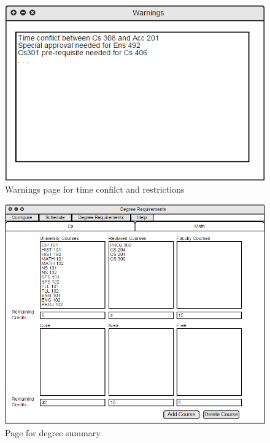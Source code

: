 \documentclass[twoside,letterpaper]{article}
\begin{document}
\begin{figure}[h!]
\centering
\includegraphics[keepaspectratio, scale=0.45]{Mockups/warning.png}
\caption{Warnings page for time confilct and restrictions}
\label{fig:mockupWarning}
\end{figure}

\begin{figure}[h!]
\centering
\includegraphics[keepaspectratio, scale=0.65]{Mockups/degree.png}
\caption{Page for degree summary}
\label{fig:mockupDegree}
\end{figure}
\end{document}

